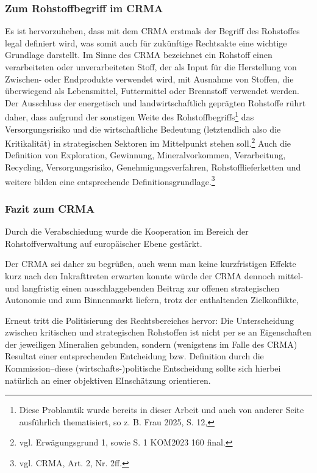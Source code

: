 \documentclass[12pt,a4paper,oneside]{book} %
\begin{document}
	\subsubsection{Zum Rohstoffbegriff im CRMA}
	Es ist hervorzuheben, dass mit dem CRMA erstmals der Begriff des Rohstoffes legal definiert wird, was somit auch für zukünftige Rechtsakte eine wichtige Grundlage darstellt. Im Sinne des CRMA bezeichnet ein Rohstoff \glqq einen verarbeiteten oder unverarbeiteten Stoff, der als Input für die Herstellung von Zwischen- oder Endprodukte verwendet wird, mit Ausnahme von Stoffen, die überwiegend als Lebensmittel, Futtermittel oder Brennstoff verwendet werden\grqq. Der Ausschluss der energetisch und landwirtschaftlich geprägten Rohstoffe rührt daher, dass aufgrund der sonstigen Weite des Rohstoffbegriffs\footnote{Diese Problamtik wurde bereits in dieser Arbeit und auch von anderer Seite ausführlich thematisiert, so z. B. Frau 2025, S. 12, } das Versorgungsrisiko und die wirtschaftliche Bedeutung (letztendlich also die \glqq Kritikalität\grqq) in strategischen Sektoren im Mittelpunkt stehen soll.\footnote{vgl. Erwägungsgrund 1, sowie S. 1 KOM2023 160 final.}
	Auch die Definition von Exploration, Gewinnung, Mineralvorkommen, Verarbeitung, Recycling, Versorgungsrisiko, Genehmigungsverfahren, Rohstofflieferketten und weitere bilden eine entsprechende Definitionsgrundlage.\footnote{vgl. CRMA, Art. 2, Nr. 2ff.}
	
	\subsubsection{Fazit zum CRMA}
	Durch die Verabschiedung wurde die Kooperation im Bereich der Rohstoffverwaltung auf europäischer Ebene gestärkt.
	
	Der CRMA sei daher zu begrüßen, auch wenn man keine kurzfristigen Effekte kurz nach den Inkrafttreten erwarten konnte würde der CRMA dennoch mittel- und langfristig einen ausschlaggebenden Beitrag zur offenen strategischen Autonomie und zum Binnenmarkt liefern, trotz der enthaltenden Zielkonflikte,\autocite{Schäffer/Hach, ZRP 2023, 210f.}
	
	Erneut tritt die Politisierung des Rechtsbereiches hervor: Die Unterscheidung zwischen kritischen und strategischen Rohstoffen ist nicht per se an Eigenschaften der jeweiligen Mineralien gebunden, sondern (wenigstens im Falle des CRMA) Resultat einer entsprechenden Entcheidung bzw. Definition durch die Kommission--diese (wirtschafts-)politische Entscheidung sollte sich hierbei natürlich an einer objektiven EInschätzung orientieren.\autocite{Frau 2024, NVwZ, 1874, 1876}
	
\end{document}
